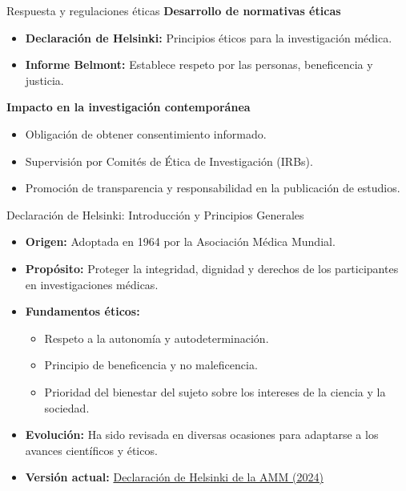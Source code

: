 ﻿\documentclass{beamer}
\begin{document}
\begin{frame}{Respuesta y regulaciones éticas}
    \textbf{Desarrollo de normativas éticas}
    \begin{itemize}
        \item \textbf{Declaración de Helsinki:} Principios éticos para la investigación médica.
        \item \textbf{Informe Belmont:} Establece respeto por las personas, beneficencia y justicia.
    \end{itemize}

    \textbf{Impacto en la investigación contemporánea}
    \begin{itemize}
        \item Obligación de obtener consentimiento informado.
        \item Supervisión por Comités de Ética de Investigación (IRBs).
        \item Promoción de transparencia y responsabilidad en la publicación de estudios.
    \end{itemize}
\end{frame}


\begin{frame}{Declaración de Helsinki: Introducción y Principios Generales}
\begin{itemize}
    \item \textbf{Origen:} Adoptada en 1964 por la Asociación Médica Mundial.
    \item \textbf{Propósito:} Proteger la integridad, dignidad y derechos de los participantes en investigaciones médicas.
    \item \textbf{Fundamentos éticos:} 
    \begin{itemize}
         \item Respeto a la autonomía y autodeterminación.
         \item Principio de beneficencia y no maleficencia.
         \item Prioridad del bienestar del sujeto sobre los intereses de la ciencia y la sociedad.
    \end{itemize}
    \item \textbf{Evolución:} Ha sido revisada en diversas ocasiones para adaptarse a los avances científicos y éticos.
    \item \textbf{Versión actual:} \href{https://www.wma.net/es/policies-post/declaracion-de-helsinki-de-la-amm-principios-eticos-para-las-investigaciones-medicas-en-seres-humanos/}{Declaración de Helsinki de la AMM (2024)}

\end{itemize}
\end{frame}
\end{document}
